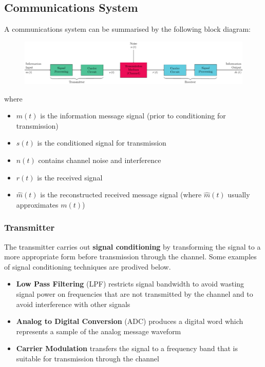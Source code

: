 \documentclass{article}
\begin{document}
\subsection{Communications System}
A communications system can be summarised by the following block
diagram:
\begin{figure}[H]
    \centering
    \includegraphics[width=\linewidth]{figures/communications_system.pdf}
\end{figure}
where
\begin{itemize}
    \item \(m\left( t \right)\) is the information message signal
          (prior to conditioning for transmission)
    \item \(s\left( t \right)\) is the conditioned signal for transmission
    \item \(n\left( t \right)\) contains channel noise and interference
    \item \(r\left( t \right)\) is the received signal
    \item \(\hat{m}\left( t \right)\) is the reconstructed received
          message signal (where \(\hat{m}\left( t \right)\) usually
          approximates \(m\left( t \right)\))
\end{itemize}
\subsubsection{Transmitter}
The transmitter carries out \textbf{signal conditioning} by
transforming the signal to a more appropriate form before transmission
through the channel. Some examples of signal conditioning techniques
are prodived below.
\begin{itemize}
    \item \textbf{Low Pass Filtering} (LPF) restricts signal bandwidth
          to avoid wasting signal power on frequencies that are not
          transmitted by the channel and to avoid interference with other
          signals
    \item \textbf{Analog to Digital Conversion} (ADC) produces a
          digital word which represents a sample of the analog message
          waveform
    \item \textbf{Carrier Modulation} transfers the signal to a
          frequency band that is suitable for transmission through the
          channel
\end{itemize}
\end{document}
